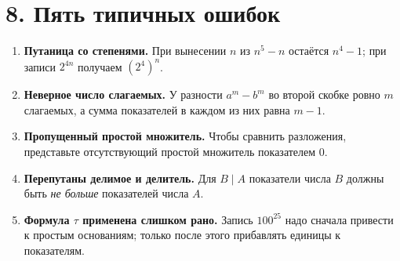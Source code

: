 \documentclass[a4paper,12pt]{article}
\newcommand{\important}[1]{\textcolor{deepaccent}{\textbf{#1}}}
\newcommand{\sectiontitle}[1]{\needspace{5\baselineskip}\section*{\color{deepaccent}#1}}
\begin{document}
\sectiontitle{8. Пять типичных ошибок}
\begin{enumerate}[leftmargin=9mm,itemsep=2pt]
\item \important{Путаница со степенями.} При вынесении $n$ из $n^5-n$ остаётся $n^4-1$; при записи $2^{4n}$ получаем $(2^4)^n$.
\item \important{Неверное число слагаемых.} У разности $a^m-b^m$ во второй скобке ровно $m$ слагаемых, а сумма показателей в каждом из них равна $m-1$.
\item \important{Пропущенный простой множитель.} Чтобы сравнить разложения, представьте отсутствующий простой множитель показателем $0$.
\item \important{Перепутаны делимое и делитель.} Для $B\mid A$ показатели числа $B$ должны быть \emph{не больше} показателей числа $A$.
\item \important{Формула $\tau$ применена слишком рано.} Запись $100^{25}$ надо сначала привести к простым основаниям; только после этого прибавлять единицы к показателям.
\end{enumerate}
\endgroup
\clearpage
\end{document}
